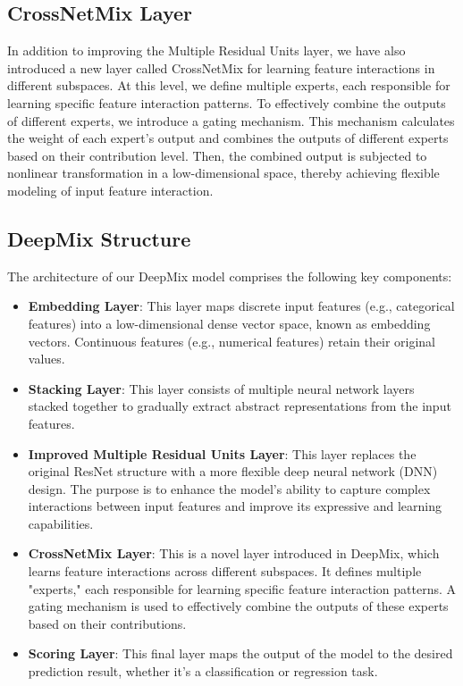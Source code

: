 \documentclass{sigkddExp}
\begin{document}
\subsection{CrossNetMix Layer}
\vspace{3mm}
In addition to improving the Multiple Residual Units layer, we have also introduced a new layer called CrossNetMix for learning feature interactions in different subspaces. At this level, we define multiple experts, each responsible for learning specific feature interaction patterns.
\vspace{3mm}\newline
To effectively combine the outputs of different experts, we introduce a gating mechanism. This mechanism calculates the weight of each expert's output and combines the outputs of different experts based on their contribution level. Then, the combined output is subjected to nonlinear transformation in a low-dimensional space, thereby achieving flexible modeling of input feature interaction.

\subsection{DeepMix Structure}
\vspace{3mm}
The architecture of our DeepMix model comprises the following key components:

\begin{itemize}
\item \textbf{Embedding Layer}: This layer maps discrete input features (e.g., categorical features) into a low-dimensional dense vector space, known as embedding vectors. Continuous features (e.g., numerical features) retain their original values.
\item \textbf{Stacking Layer}: This layer consists of multiple neural network layers stacked together to gradually extract abstract representations from the input features.
\item \textbf{Improved Multiple Residual Units Layer}: This layer replaces the original ResNet structure with a more flexible deep neural network (DNN) design. The purpose is to enhance the model's ability to capture complex interactions between input features and improve its expressive and learning capabilities.
\item \textbf{CrossNetMix Layer}: This is a novel layer introduced in DeepMix, which learns feature interactions across different subspaces. It defines multiple "experts," each responsible for learning specific feature interaction patterns. A gating mechanism is used to effectively combine the outputs of these experts based on their contributions.
\item \textbf{Scoring Layer}: This final layer maps the output of the model to the desired prediction result, whether it's a classification or regression task.
\end{itemize}
\end{document}
